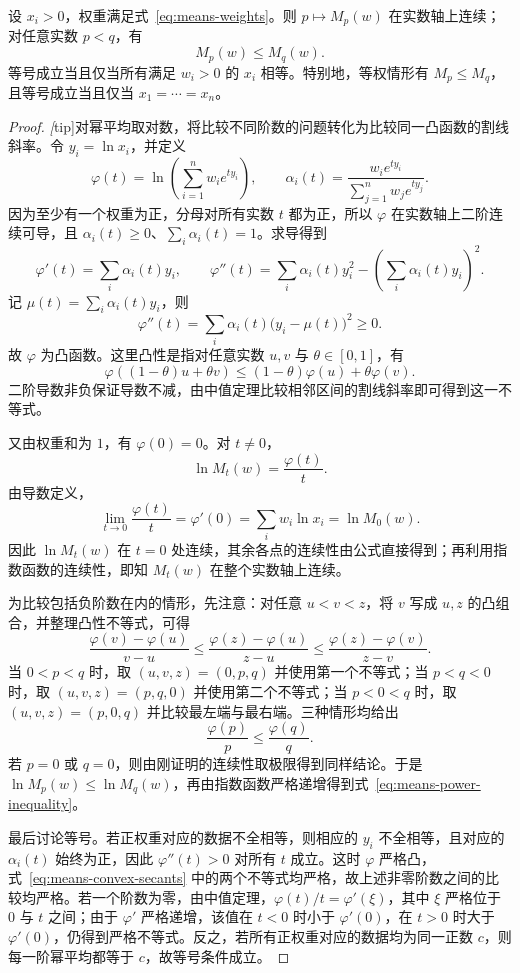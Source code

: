 \documentclass[UTF8,12pt,a4paper,fontset=fandol]{ctexart}
\begin{document}
\begin{theorem}[幂平均不等式]
\label{thm:means-power-inequality}
设 $x_i>0$，权重满足式~\eqref{eq:means-weights}。则 $p\mapsto M_p(w)$ 在实数轴上连续；对任意实数 $p<q$，有
\begin{equation}
\label{eq:means-power-inequality}
  M_p(w)\le M_q(w).
\end{equation}
等号成立当且仅当所有满足 $w_i>0$ 的 $x_i$ 相等。特别地，等权情形有 $M_p\le M_q$，且等号成立当且仅当 $x_1=\cdots=x_n$。
\end{theorem}

\begin{proof}
\emph[tip]{对幂平均取对数，将比较不同阶数的问题转化为比较同一凸函数的割线斜率。}令 $y_i=\ln x_i$，并定义
\[
  \varphi(t)=\ln\left(\sum_{i=1}^n w_i e^{t y_i}\right),
  \qquad
  \alpha_i(t)=\frac{w_i e^{t y_i}}{\sum_{j=1}^n w_j e^{t y_j}}.
\]
因为至少有一个权重为正，分母对所有实数 $t$ 都为正，所以 $\varphi$ 在实数轴上二阶连续可导，且 $\alpha_i(t)\ge0$、$\sum_i\alpha_i(t)=1$。求导得到
\[
  \varphi'(t)=\sum_i\alpha_i(t)y_i,
  \qquad
  \varphi''(t)=\sum_i\alpha_i(t)y_i^2
  -\left(\sum_i\alpha_i(t)y_i\right)^2.
\]
记 $\mu(t)=\sum_i\alpha_i(t)y_i$，则
\[
  \varphi''(t)=\sum_i\alpha_i(t)\bigl(y_i-\mu(t)\bigr)^2\ge0.
\]
故 $\varphi$ 为凸函数。这里凸性是指对任意实数 $u,v$ 与 $\theta\in[0,1]$，有
\[
  \varphi((1-\theta)u+\theta v)
  \le(1-\theta)\varphi(u)+\theta\varphi(v).
\]
二阶导数非负保证导数不减，由中值定理比较相邻区间的割线斜率即可得到这一不等式。

又由权重和为 $1$，有 $\varphi(0)=0$。对 $t\ne0$，
\[
  \ln M_t(w)=\frac{\varphi(t)}{t}.
\]
由导数定义，
\[
  \lim_{t\to0}\frac{\varphi(t)}{t}
  =\varphi'(0)=\sum_iw_i\ln x_i=\ln M_0(w).
\]
因此 $\ln M_t(w)$ 在 $t=0$ 处连续，其余各点的连续性由公式直接得到；再利用指数函数的连续性，即知 $M_t(w)$ 在整个实数轴上连续。

为比较包括负阶数在内的情形，先注意：对任意 $u<v<z$，将 $v$ 写成 $u,z$ 的凸组合，并整理凸性不等式，可得
\begin{equation}
\label{eq:means-convex-secants}
  \frac{\varphi(v)-\varphi(u)}{v-u}
  \le\frac{\varphi(z)-\varphi(u)}{z-u}
  \le\frac{\varphi(z)-\varphi(v)}{z-v}.
\end{equation}
当 $0<p<q$ 时，取 $(u,v,z)=(0,p,q)$ 并使用第一个不等式；当 $p<q<0$ 时，取 $(u,v,z)=(p,q,0)$ 并使用第二个不等式；当 $p<0<q$ 时，取 $(u,v,z)=(p,0,q)$ 并比较最左端与最右端。三种情形均给出
\[
  \frac{\varphi(p)}{p}\le\frac{\varphi(q)}{q}.
\]
若 $p=0$ 或 $q=0$，则由刚证明的连续性取极限得到同样结论。于是 $\ln M_p(w)\le\ln M_q(w)$，再由指数函数严格递增得到式~\eqref{eq:means-power-inequality}。

最后讨论等号。若正权重对应的数据不全相等，则相应的 $y_i$ 不全相等，且对应的 $\alpha_i(t)$ 始终为正，因此 $\varphi''(t)>0$ 对所有 $t$ 成立。这时 $\varphi$ 严格凸，式~\eqref{eq:means-convex-secants} 中的两个不等式均严格，故上述非零阶数之间的比较均严格。若一个阶数为零，由中值定理，$\varphi(t)/t=\varphi'(\xi)$，其中 $\xi$ 严格位于 $0$ 与 $t$ 之间；由于 $\varphi'$ 严格递增，该值在 $t<0$ 时小于 $\varphi'(0)$，在 $t>0$ 时大于 $\varphi'(0)$，仍得到严格不等式。反之，若所有正权重对应的数据均为同一正数 $c$，则每一阶幂平均都等于 $c$，故等号条件成立。
\end{proof}
\end{document}
